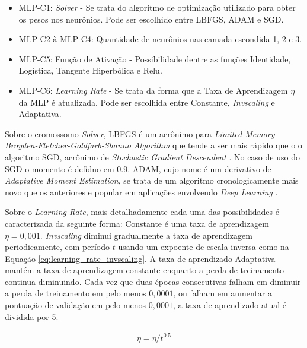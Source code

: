 \begin{itemize}
    \item MLP-C1: \textit{Solver} - Se trata do algoritmo de optimização utilizado para obter os pesos nos neurônios. Pode ser escolhido entre LBFGS, ADAM e SGD. 
    
    \item MLP-C2 à MLP-C4: Quantidade de neurônios nas camada escondida 1, 2 e 3.
    
    \item MLP-C5: Função de Ativação - Possibilidade dentre as funções Identidade, Logística, Tangente Hiperbólica e Relu.
    
    \item MLP-C6: \textit{Learning Rate} - Se trata da forma que a Taxa de Aprendizagem $\eta$ da MLP é atualizada. Pode ser escolhida entre Constante, \textit{Invscaling} e Adaptativa.
    
\end{itemize}

Sobre o cromossomo \textit{Solver}, LBFGS é um acrônimo para \textit{Limited\hyp{}Memory Broyden\hyp{}Fletcher\hyp{}Goldfarb\hyp{}Shanno Algorithm} que tende a ser mais rápido que o o algoritmo SGD, acrônimo de \textit{Stochastic Gradient Descendent} \cite{le2011optimization}. No caso de uso do SGD o momento é defidno em 0.9. ADAM, cujo nome é um derivativo de \textit{Adaptative Moment Estimation}, se trata de um algoritmo cronologicamente mais novo que os anteriores e popular em aplicações envolvendo \textit{Deep Learning} \cite{kingma2014adam, yi2020effective, jais2019adam}.

Sobre o \textit{Learning Rate}, mais detalhadamente cada uma das possibilidades é caracterizada da seguinte forma: Constante é uma taxa de aprendizagem $\eta=0,001$. \textit{Invscaling} diminui gradualmente a taxa de aprendizagem periodicamente, com período $t$ usando um expoente de escala inversa como na Equação \ref{eq:learning_rate_invscaling}. A taxa de aprendizado Adaptativa mantém a taxa de aprendizagem constante enquanto a perda de treinamento continua diminuindo. Cada vez que duas épocas consecutivas falham em diminuir a perda de treinamento em pelo menos $0,0001$, ou falham em aumentar a pontuação de validação em pelo menos $0,0001$, a taxa de aprendizado atual é dividida por 5.

\begin{equation}
\label{eq:learning_rate_invscaling}
    \begin{gathered}
    \eta = \eta \slash t^{0.5}
    \end{gathered}
\end{equation}

